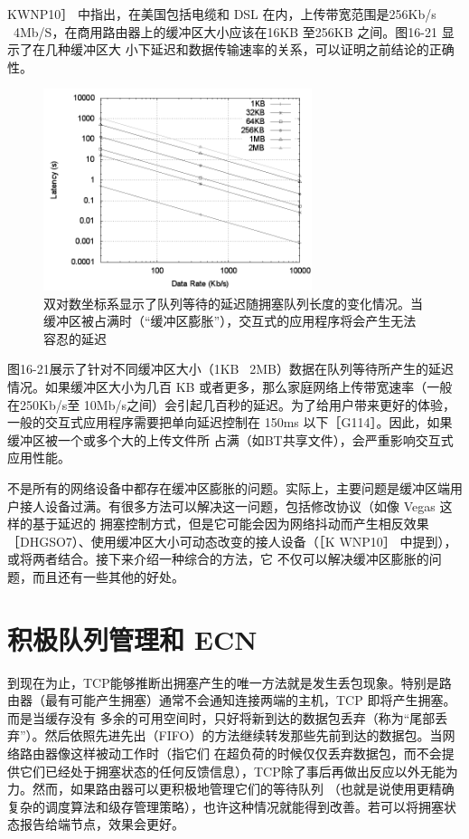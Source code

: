KWNP10］ 中指出，在美国包括电缆和 DSL 在内，上传带宽范围是256Kb/s ~4Mb/S，在商用路由器上的缓冲区大小应该在16KB 至256KB 之间。图16-21 显示了在几种缓冲区大
小下延迟和数据传输速率的关系，可以证明之前结论的正确性。

\begin{figure}[!htb]
    \centering
	\includegraphics[width=0.7\textwidth]{imgs/16/16-21.png}
	\caption{双对数坐标系显示了队列等待的延迟随拥塞队列长度的变化情况。当缓冲区被占满时（“缓冲区膨胀”），交互式的应用程序将会产生无法容忍的延迟}
\end{figure}

图16-21展示了针对不同缓冲区大小（1KB ~2MB）数据在队列等待所产生的延迟情况。如果缓冲区大小为几百 KB 或者更多，那么家庭网络上传带宽速率（一般在250Kb/s至
10Mb/s之间）会引起几百秒的延迟。为了给用户带来更好的体验，一般的交互式应用程序需要把单向延迟控制在 150ms 以下［G114］。因此，如果缓冲区被一个或多个大的上传文件所
占满（如BT共享文件），会严重影响交互式应用性能。

不是所有的网络设备中都存在缓冲区膨胀的问题。实际上，主要问题是缓冲区端用户接人设备过满。有很多方法可以解决这一问题，包括修改协议（如像 Vegas 这样的基于延迟的
拥塞控制方式，但是它可能会因为网络抖动而产生相反效果 ［DHGSO7）、使用缓冲区大小可动态改变的接人设备（［K WNP10］ 中提到），或将两者结合。接下来介绍一种综合的方法，它
不仅可以解决缓冲区膨胀的问题，而且还有一些其他的好处。

\section{积极队列管理和 ECN}
到现在为止，TCP能够推断出拥塞产生的唯一方法就是发生丢包现象。特别是路由器（最有可能产生拥塞）通常不会通知连接两端的主机，TCP 即将产生拥塞。而是当缓存没有
多余的可用空间时，只好将新到达的数据包丢弃（称为“尾部丢弃”）。然后依照先进先出（FIFO）的方法继续转发那些先前到达的数据包。当网络路由器像这样被动工作时（指它们
在超负荷的时候仅仅丢弃数据包，而不会提供它们已经处于拥塞状态的任何反馈信息），TCP除了事后再做出反应以外无能为力。然而，如果路由器可以更积极地管理它们的等待队列
（也就是说使用更精确复杂的调度算法和级存管理策略），也许这种情况就能得到改善。若可以将拥塞状态报告给端节点，效果会更好。

